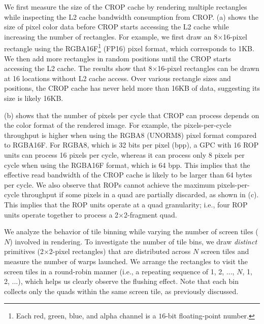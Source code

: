 We first measure the size of the CROP cache by rendering multiple rectangles
while inspecting the L2 cache bandwidth consumption from CROP.
%
(a) shows the size of pixel color data before CROP starts
accessing the L2 cache while increasing the number of rectangles. 
%
For example, we first draw an 8{$\times$}16-pixel rectangle using the
RGBA16F\footnote{Each red, green, blue, and alpha channel is a $16$-bit
floating-point number.} (FP16) pixel format, which corresponds to 1{KB}.
%
We then add more rectangles in random positions until the CROP starts accessing
the L2 cache.
%
The results show that 8{$\times$}16-pixel rectangles can be drawn at 16
locations without L2 cache access.
%
Over various rectangle sizes and positions, the CROP cache has never held more
than 16KB of data, suggesting its size is likely 16KB. 

(b) shows that the number of pixels per cycle that CROP
can process depends on the color format of the rendered image. For example, the
pixels-per-cycle throughput is higher when using the RGBA8 (UNORM8) pixel
format compared to RGBA16F. For RGBA8, which is 32 bits per pixel (bpp), a GPC
with 16 ROP units can process 16 pixels per cycle, whereas it can process only
8 pixels per cycle when using the RGBA16F format, which is 64 bpp. 
%
This implies that the effective read bandwidth of the CROP cache is likely to
be larger than 64 bytes per cycle.
%
We also observe that ROPs cannot achieve the maximum pixels-per-cycle
throughput if some pixels in a quad are partially discarded, as shown in
(c). This implies that the ROP units operate at a quad
granularity; i.e., four ROP units operate together to process a
2$\times$2-fragment quad.


%
We analyze the behavior of tile binning while varying the number of screen
tiles ($N$) involved in rendering.
%
To investigate the number of tile bins, we draw \emph{distinct} primitives
(2$\times$2-pixel rectangles) that are distributed across $N$ screen tiles and
measure the number of warps launched.
%
We arrange the rectangles to visit the screen tiles in a round-robin manner
(i.e., a repeating sequence of 1, 2, ..., $N$, 1, 2, ...), which helps us
clearly observe the flushing effect.
%
Note that each bin collects only the quads within the same screen tile, as
previously discussed.


